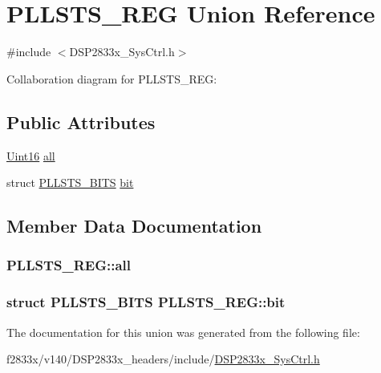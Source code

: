 \hypertarget{union_p_l_l_s_t_s___r_e_g}{}\section{P\+L\+L\+S\+T\+S\+\_\+\+R\+E\+G Union Reference}
\label{union_p_l_l_s_t_s___r_e_g}


{\ttfamily \#include $<$D\+S\+P2833x\+\_\+\+Sys\+Ctrl.\+h$>$}



Collaboration diagram for P\+L\+L\+S\+T\+S\+\_\+\+R\+E\+G\+:
\subsection*{Public Attributes}
\begin{DoxyCompactItemize}
\item 
\hyperlink{_d_s_p2833x___device_8h_a59a9f6be4562c327cbfb4f7e8e18f08b}{Uint16} \hyperlink{union_p_l_l_s_t_s___r_e_g_a09c55a9d3d0af27a2d3a83cbdbb2105c}{all}
\item 
struct \hyperlink{struct_p_l_l_s_t_s___b_i_t_s}{P\+L\+L\+S\+T\+S\+\_\+\+B\+I\+T\+S} \hyperlink{union_p_l_l_s_t_s___r_e_g_a69c8bbd6131fdc87fb9736ce86c41918}{bit}
\end{DoxyCompactItemize}


\subsection{Member Data Documentation}
\hypertarget{union_p_l_l_s_t_s___r_e_g_a09c55a9d3d0af27a2d3a83cbdbb2105c}{}
\subsubsection[{all}]{ P\+L\+L\+S\+T\+S\+\_\+\+R\+E\+G\+::all}\label{union_p_l_l_s_t_s___r_e_g_a09c55a9d3d0af27a2d3a83cbdbb2105c}
\hypertarget{union_p_l_l_s_t_s___r_e_g_a69c8bbd6131fdc87fb9736ce86c41918}{}
\subsubsection[{bit}]{\setlength{\rightskip}{0pt plus 5cm}struct {\bf P\+L\+L\+S\+T\+S\+\_\+\+B\+I\+T\+S} P\+L\+L\+S\+T\+S\+\_\+\+R\+E\+G\+::bit}\label{union_p_l_l_s_t_s___r_e_g_a69c8bbd6131fdc87fb9736ce86c41918}


The documentation for this union was generated from the following file\+:\begin{DoxyCompactItemize}
\item 
f2833x/v140/\+D\+S\+P2833x\+\_\+headers/include/\hyperlink{_d_s_p2833x___sys_ctrl_8h}{D\+S\+P2833x\+\_\+\+Sys\+Ctrl.\+h}\end{DoxyCompactItemize}

